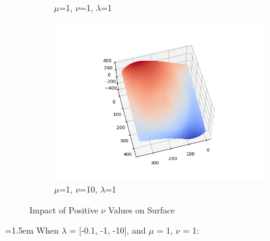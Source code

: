 \documentclass{article}
\begin{document}
\begin{figure}[H]
\begin{subfigure}{0.32\textwidth}
		\caption{$\mu$=1, $\nu$=1, $\lambda$=1}
	\end{subfigure}
	\hfill
	\begin{subfigure}{0.32\textwidth}
		\centering
		\includegraphics[width=\textwidth]{./src/2f_v_change/faceCalibrated_mu_1_v_10_lambda_1.png}
		\caption{$\mu$=1, $\nu$=10, $\lambda$=1}
	\end{subfigure}
	
	\caption{Impact of Positive $\nu$ Values on Surface}
	\label{fig:v_p_ul}
\end{figure}	
	\hangindent=1.5em \hspace{1.5em}When $\lambda$ = [-0.1, -1, -10], and $\mu$ = 1, $\nu$ = 1: \\
\end{document}
